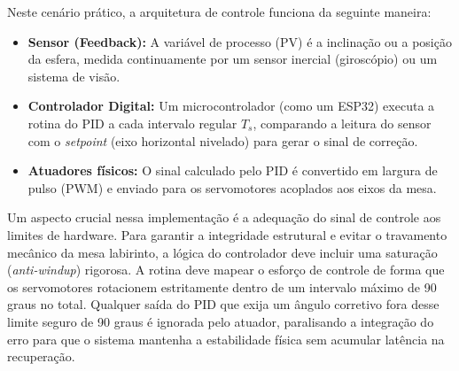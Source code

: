 \documentclass[12pt]{article}
\begin{document}
Neste cenário prático, a arquitetura de controle funciona da seguinte maneira:
\begin{itemize}
    \item \textbf{Sensor (Feedback):} A variável de processo (PV) é a inclinação ou a posição da esfera, medida continuamente por um sensor inercial (giroscópio) ou um sistema de visão.
    \item \textbf{Controlador Digital:} Um microcontrolador (como um ESP32) executa a rotina do PID a cada intervalo regular $T_s$, comparando a leitura do sensor com o \textit{setpoint} (eixo horizontal nivelado) para gerar o sinal de correção.
    \item \textbf{Atuadores físicos:} O sinal calculado pelo PID é convertido em largura de pulso (PWM) e enviado para os servomotores acoplados aos eixos da mesa.
\end{itemize}

Um aspecto crucial nessa implementação é a adequação do sinal de controle aos limites de hardware. Para garantir a integridade estrutural e evitar o travamento mecânico da mesa labirinto, a lógica do controlador deve incluir uma saturação (\textit{anti-windup}) rigorosa. A rotina deve mapear o esforço de controle de forma que os servomotores rotacionem estritamente dentro de um intervalo máximo de 90 graus no total. Qualquer saída do PID que exija um ângulo corretivo fora desse limite seguro de 90 graus é ignorada pelo atuador, paralisando a integração do erro para que o sistema mantenha a estabilidade física sem acumular latência na recuperação.
\end{document}
